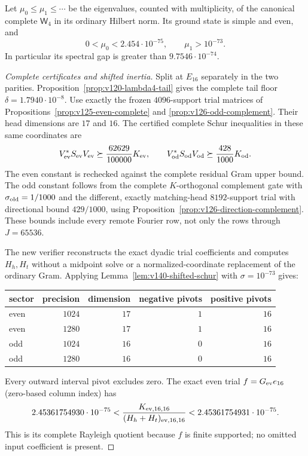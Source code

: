 \begin{proposition}[Complete ground ordering at $\lambda=4$]
\label{prop:v140-ground4}
Let $\mu_0\le\mu_1\le\cdots$ be the eigenvalues, counted with
multiplicity, of the canonical complete $\mathsf W_4$ in its ordinary
Hilbert norm. Its ground state is simple and even, and
\begin{equation}\label{eq:v140-ground4-bounds}
 0<\mu_0<2.454\cdot10^{-75},\qquad \mu_1>10^{-73}.
\end{equation}
In particular its spectral gap is greater than $9.7546\cdot10^{-74}$.
\end{proposition}
\begin{proof}[Complete certificates and shifted inertia]
Split at $E_{16}$ separately in the two parities.
Proposition~\ref{prop:v120-lambda4-tail} gives the complete tail floor
$\delta=1.7940\cdot10^{-8}$. Use exactly the frozen $4096$-support
trial matrices of Propositions~\ref{prop:v125-even-complete} and
\ref{prop:v126-odd-complement}. Their head dimensions are $17$ and
$16$. The certified complete Schur inequalities in these same
coordinates are
\[
 V_{\rm ev}^*S_{\rm ev}V_{\rm ev}\succeq
       \frac{62629}{100000}K_{\rm ev},\qquad
 V_{\rm od}^*S_{\rm od}V_{\rm od}\succeq
       \frac{428}{1000}K_{\rm od}.
\]
The even constant is rechecked against the complete residual Gram
upper bound. The odd constant follows from the complete
$K$-orthogonal complement gate with $\sigma_{\rm old}=1/1000$
and the different, exactly matching-head $8192$-support trial with
directional bound $429/1000$, using
Proposition~\ref{prop:v126-direction-complement}. These bounds include
every remote Fourier row, not only the rows through $J=65536$.

The new verifier reconstructs the exact dyadic trial coefficients
and computes $H_h,H_t$ without a midpoint solve or a normalized-coordinate
replacement of the ordinary Gram. Applying
Lemma~\ref{lem:v140-shifted-schur} with $\sigma=10^{-73}$ gives:
\begin{center}
\begin{tabular}{lrrrr}
\toprule
sector & precision & dimension & negative pivots & positive pivots\\
\midrule
even & $1024$ & $17$ & $1$ & $16$\\
even & $1280$ & $17$ & $1$ & $16$\\
odd & $1024$ & $16$ & $0$ & $16$\\
odd & $1280$ & $16$ & $0$ & $16$\\
\bottomrule
\end{tabular}
\end{center}
Every outward interval pivot excludes zero. The exact even trial
$f=G_{\rm ev}e_{16}$ (zero-based column index) has
\[
 2.45361754930\cdot10^{-75}
 <\frac{K_{{\rm ev},16,16}}{(H_h+H_t)_{{\rm ev},16,16}}
 <2.45361754931\cdot10^{-75}.
\]
This is its complete Rayleigh quotient because $f$ is finite
supported; no omitted input coefficient is present.


\end{proof}

